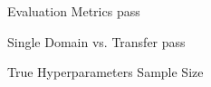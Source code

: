 \documentclass[aspectratio=169, 11pt, invertlogo]{ismll-slides}
\begin{document}
\begin{frame}[fragile]{Evaluation Metrics}
	pass
\end{frame}




\begin{frame}[fragile]{Single Domain vs. Transfer}
	pass
\end{frame}




\begin{frame}[fragile]{True Hyperparameters}
	Sample Size
\end{frame}



\appendix




\begin{frame}[allowframebreaks]%
%
\printbibliography%
%
\end{frame}

\end{document}
